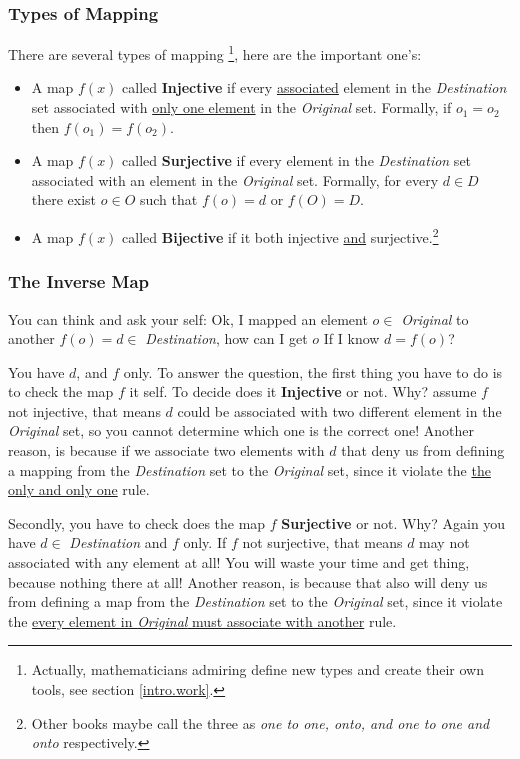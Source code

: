 \subsubsection{Types of Mapping}
There are several types of mapping \footnote{Actually, mathematicians admiring define new types and create their own tools, see section \ref{intro.work}.}, here are the important one's:
\begin{itemize}
    \item A map $f(x)$ called {\bf Injective} if every \underline{associated} element in the {\it Destination} set associated with \underline{only one element} in the {\it Original} set. Formally, if $o_1 = o_2$ then $f(o_1) = f(o_2)$.
    \item A map $f(x)$ called {\bf Surjective} if every element in the {\it Destination} set associated with an element in the {\it Original} set. Formally, for every $d \in D$ there exist $o \in O$ such that $f(o)=d$ or $f(O)=D$.
    \item A map $f(x)$ called {\bf Bijective} if it both injective \underline{and} surjective.\footnote{Other books maybe call the three as {\it  one to one, onto, and one to one and onto} respectively.}
\end{itemize}
\subsubsection{The Inverse Map} You can think and ask your self: Ok, I mapped an element $o \in$ {\it Original} to another $f(o) = d \in$ {\it Destination}, how can I get $o$ If I know $d = f(o)$? 

You have $d$, and $f$ only. To answer the question, the first thing you have to do is to check the map $f$ it self. To decide does it {\bf Injective} or not. Why? assume $f$ not injective, that means $d$ could be associated with two different element in the {\it Original} set, so you cannot determine which one is the correct one! Another reason, is because if we associate two elements with $d$ that deny us from defining a mapping from the {\it Destination } set to the {\it Original} set, since it violate the \underline{the only and only one} rule.

Secondly, you have to check does the map $f$ {\bf Surjective} or not. Why? Again you have $d \in$ {\it Destination} and $f$ only. If $f$ not surjective, that means $d$ may not associated with any element at all! You will waste your time and get thing, because nothing there at all! Another reason, is because that also will deny us from defining a map from the {\it Destination } set to the {\it Original} set, since it violate the \underline{every element in {\it Original} must associate with another} rule.

